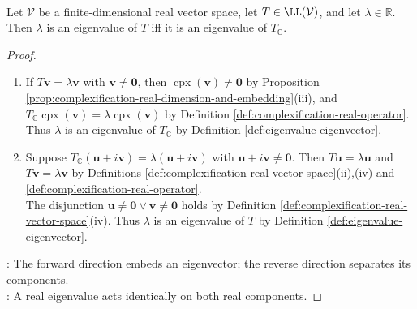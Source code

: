 \begin{proposition} \label{prop:real-eigenvalues-complexification} \\
Let $\mathcal{V}$ be a finite-dimensional real vector space, let $T\in\LL(\mathcal{V})$, and let $\lambda\in\mathbb{R}$. Then $\lambda$ is an eigenvalue of $T$ iff it is an eigenvalue of $T_{\mathbb{C}}$.
\begin{proof}
\begin{enumerate}[label=\roman*.]
\setlength{\itemsep}{0pt}
\item[$(\Rightarrow)$] If $T\mathbf{v}=\lambda\mathbf{v}$ with $\mathbf{v}\neq\mathbf{0}$, then $\operatorname{cpx}(\mathbf{v})\neq\mathbf{0}$ by Proposition \ref{prop:complexification-real-dimension-and-embedding}(iii), and $T_{\mathbb{C}}\operatorname{cpx}(\mathbf{v})=\lambda\operatorname{cpx}(\mathbf{v})$ by Definition \ref{def:complexification-real-operator}.\\
Thus $\lambda$ is an eigenvalue of $T_{\mathbb{C}}$ by Definition \ref{def:eigenvalue-eigenvector}.
\item[$(\Leftarrow)$] Suppose $T_{\mathbb{C}}(\mathbf{u}+i\mathbf{v})=\lambda(\mathbf{u}+i\mathbf{v})$ with $\mathbf{u}+i\mathbf{v}\neq\mathbf{0}$. Then $T\mathbf{u}=\lambda\mathbf{u}$ and $T\mathbf{v}=\lambda\mathbf{v}$ by Definitions \ref{def:complexification-real-vector-space}(ii),(iv) and \ref{def:complexification-real-operator}.\\
The disjunction $\mathbf{u}\neq\mathbf{0}\lor\mathbf{v}\neq\mathbf{0}$ holds by Definition \ref{def:complexification-real-vector-space}(iv). Thus $\lambda$ is an eigenvalue of $T$ by Definition \ref{def:eigenvalue-eigenvector}.
\end{enumerate}
: The forward direction embeds an eigenvector; the reverse direction separates its components.\\
: A real eigenvalue acts identically on both real components.
\end{proof}
\end{proposition}

